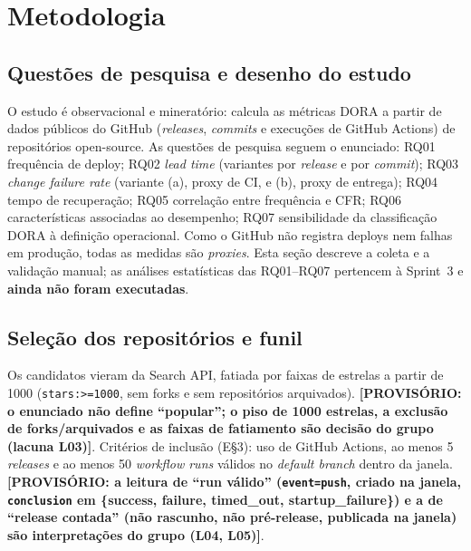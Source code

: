 \newcommand{\prov}[1]{\textbf{[PROVISÓRIO: #1]}}

\section{Metodologia}

\subsection{Questões de pesquisa e desenho do estudo}
O estudo é observacional e mineratório: calcula as métricas DORA a partir de dados públicos do GitHub
(\textit{releases}, \textit{commits} e execuções de GitHub Actions) de repositórios open-source. As
questões de pesquisa seguem o enunciado: RQ01 frequência de deploy; RQ02 \textit{lead time} (variantes
por \textit{release} e por \textit{commit}); RQ03 \textit{change failure rate} (variante (a), proxy de CI,
e (b), proxy de entrega); RQ04 tempo de recuperação; RQ05 correlação entre frequência e CFR; RQ06
características associadas ao desempenho; RQ07 sensibilidade da classificação DORA à definição operacional.
Como o GitHub não registra deploys nem falhas em produção, todas as medidas são \emph{proxies}.
Esta seção descreve a coleta e a validação manual; as análises estatísticas das RQ01--RQ07 pertencem à
Sprint~3 e \textbf{ainda não foram executadas}.

\subsection{Seleção dos repositórios e funil}
Os candidatos vieram da Search API, fatiada por faixas de estrelas a partir de 1000 (\texttt{stars:>=1000},
sem forks e sem repositórios arquivados). \prov{o enunciado não define ``popular''; o piso de 1000 estrelas,
a exclusão de forks/arquivados e as faixas de fatiamento são decisão do grupo (lacuna L03)}.
Critérios de inclusão (E§3): uso de GitHub Actions, ao menos 5 \textit{releases} e ao menos 50
\textit{workflow runs} válidos no \textit{default branch} dentro da janela. \prov{a leitura de ``run válido''
(\texttt{event=push}, criado na janela, \texttt{conclusion} em \{success, failure, timed\_out,
startup\_failure\}) e a de ``release contada'' (não rascunho, não pré-release, publicada na janela) são
interpretações do grupo (L04, L05)}.

